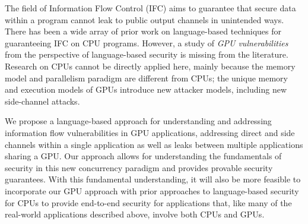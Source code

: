 The field of Information Flow Control (IFC) aims to guarantee that secure
data within a program cannot leak to public output channels in unintended
ways.
%
There has been a wide array of prior work on language-based techniques for
guaranteeing IFC on CPU programs.
%
However, a study of \emph{GPU vulnerabilities} from the perspective of language-based security is missing from the literature.
%
Research on CPUs cannot be directly applied here, mainly because the memory model and parallelism paradigm are different from CPUs; the unique memory and execution models of GPUs  introduce new attacker models, including new side-channel attacks.

%
%


%
%

%

We propose a language-based approach for understanding and addressing information flow vulnerabilities in GPU applications, addressing direct and side channels within a single application as well as leaks between multiple applications sharing a GPU.
%
Our approach allows for understanding the fundamentals of security in this new concurrency paradigm and provides provable security guarantees.
%
With this fundamental understanding, it will also be more feasible to incorporate our GPU approach with prior approaches to language-based security for CPUs to provide end-to-end security for applications that, like many of the real-world applications described above, involve both CPUs and GPUs.


